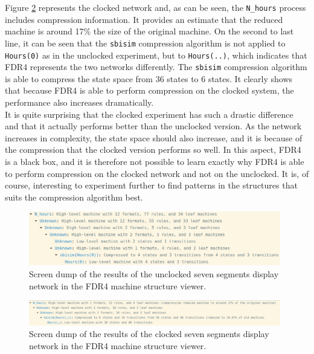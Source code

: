 Figure \ref{fig:clocked_compression} represents the clocked network and, as can be seen, the \texttt{N\_hours} process includes compression information. It provides an estimate that the reduced machine is around 17\% the size of the original machine. On the second to last line, it can be seen that the \texttt{sbisim} compression algorithm is not applied to \texttt{Hours(0)} as in the unclocked experiment, but to \texttt{Hours(..)}, which indicates that FDR4 represents the two networks differently. The \texttt{sbisim} compression algorithm is able to compress the state space from 36 states to 6 states. It clearly shows that because FDR4 is able to perform compression on the clocked system, the performance also increases dramatically.\\

It is quite surprising that the clocked experiment has such a drastic difference and that it actually performs better than the unclocked version. As the network increases in complexity, the state space should also increase, and it is because of the compression that the clocked version performs so well.
In this aspect, FDR4 is a black box, and it is therefore not possible to learn exactly why FDR4 is able to perform compression on the clocked network and not on the unclocked. It is, of course, interesting to experiment further to find patterns in the \cspm{} structures that suits the compression algorithm best.
\begin{figure}
    \includegraphics[width=0.98\textwidth]{./figures/unclocked_compression.jpg}
\caption{Screen dump of the results of the unclocked seven segments display network in the FDR4 machine structure viewer.}
\label{fig:unclocked_compression}
\end{figure}
\begin{figure}
    \includegraphics[width=0.98\textwidth]{./figures/clocked_compression.jpg}
\caption{Screen dump of the results of the clocked seven segments display network in the FDR4 machine structure viewer.}
\label{fig:clocked_compression}
\end{figure}

